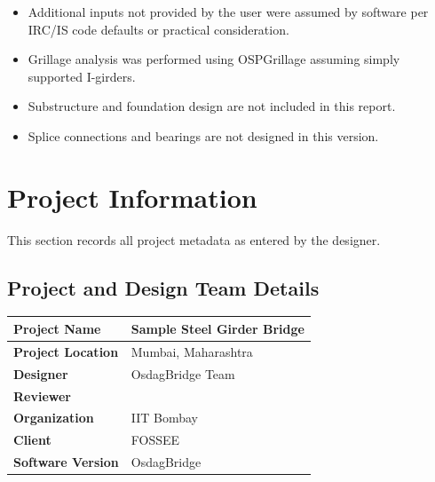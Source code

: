 \documentclass[12pt,a4paper]{report}
\numberwithin{table}{chapter}
\numberwithin{figure}{chapter}
\begin{document}
\begin{itemize}
\item Additional inputs not provided by the user were assumed by software per IRC/IS code defaults or practical consideration.
\item Grillage analysis was performed using OSPGrillage assuming simply supported I-girders.
\item Substructure and foundation design are not included in this report.
\item Splice connections and bearings are not designed in this version.
\end{itemize}

\titleformat{\chapter}[block]{\normalfont\Large\bfseries\centering}{\thechapter}{1em}{}
\titlespacing*{\chapter}{0pt}{-30pt}{10pt}


\chapter{Project Information}

This section records all project metadata as entered by the designer.

\section{Project and Design Team Details}
\label{sec:project-details}

\vspace{0.4cm}
\begin{tabular}{|L{5.5cm}|L{8.5cm}|}
\hline
\textbf{Project Name} & Sample Steel Girder Bridge \\
\hline
\textbf{Project Location} & Mumbai, Maharashtra \\
\hline
\textbf{Designer} & OsdagBridge Team \\
\hline
\textbf{Reviewer} &  \\
\hline
\textbf{Organization} & IIT Bombay \\
\hline
\textbf{Client} & FOSSEE \\
\hline
\textbf{Software Version} & OsdagBridge \\
\hline
\end{tabular}
\end{document}
